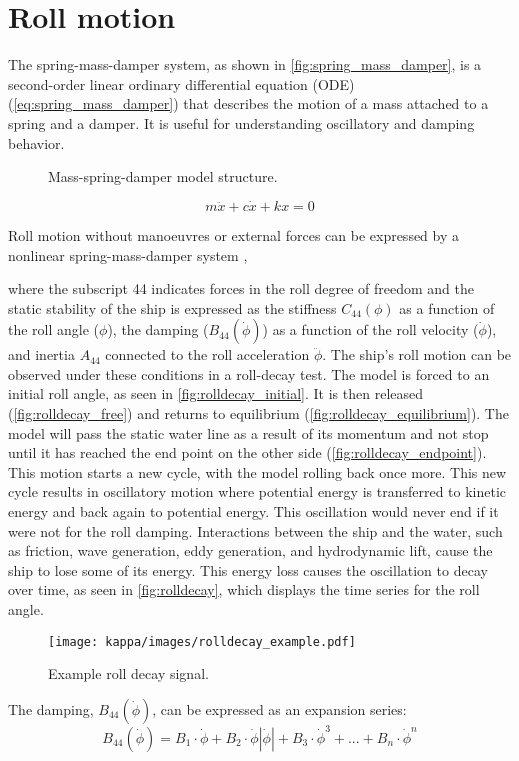 \section{Roll motion} \label{sec:roll}
The spring-mass-damper system, as shown in \autoref{fig:spring_mass_damper}, is a second-order linear ordinary differential equation (ODE) (\autoref{eq:spring_mass_damper}) that describes the motion of a mass attached to a spring and a damper. It is useful for understanding oscillatory and damping behavior.
\begin{figure}[h]
    \centering
    
    \caption{Mass-spring-damper model structure.}
    \label{fig:spring_mass_damper}
\end{figure}
\begin{equation} \label{eq:spring_mass_damper}
m\ddot{x} + c\dot{x} + kx = 0
\end{equation}

Roll motion without manoeuvres or external forces can be expressed by a nonlinear spring-mass-damper system \cite{himenoPredictionShipRoll1981},

\noindent where the subscript 44 indicates forces in the roll degree of freedom and the static stability of the ship is expressed as the stiffness $C_{44}(\phi)$ as a function of the roll angle ($\phi$), the damping ($B_{44}(\dot{\phi})$) as a function of the roll velocity ($\dot{\phi}$), and inertia $A_{44}$ connected to the roll acceleration $\ddot{\phi}$. The ship's roll motion can be observed under these conditions in a roll-decay test. The model is forced to an initial roll angle, as seen in \autoref{fig:rolldecay_initial}. It is then released (\autoref{fig:rolldecay_free}) and returns to equilibrium (\autoref{fig:rolldecay_equilibrium}). The model will pass the static water line as a result of its momentum and not stop until it has reached the end point on the other side (\autoref{fig:rolldecay_endpoint}). This motion starts a new cycle, with the model rolling back
once more. This new cycle results in oscillatory motion where potential energy is transferred to kinetic energy and back again to potential energy.
This oscillation would never end if it were not for the roll damping. Interactions between the ship and the water, such as friction, wave generation, eddy generation, and hydrodynamic lift, cause the ship to lose some of its energy. This energy loss causes the oscillation to decay over time, as seen in \autoref{fig:rolldecay}, which displays the time series for the roll angle.

\begin{figure}[H]
    \centering
    \texttt{[image: kappa/images/rolldecay\_example.pdf]}
    \caption{Example roll decay signal.}
    \label{fig:rolldecay}
\end{figure}
The damping, $B_{44}\left(\dot{\phi}\right)$, can be expressed as an expansion series:  
\begin{equation}
    B_{44}\left(\dot{\phi}\right) = B_1\cdot\dot{\phi} + B_2\cdot\dot{\phi}\left|\dot{\phi}\right| + B_3\cdot\dot{\phi}^3 + ... + B_n\cdot\dot{\phi}^n
\end{equation}
 

